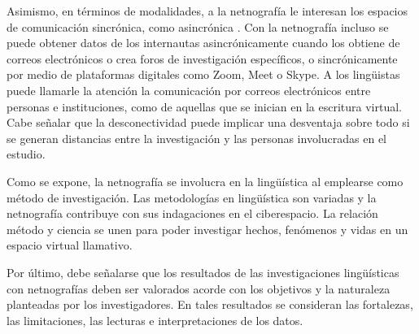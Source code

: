 Asimismo, en términos de modalidades, a la netnografía le interesan los
espacios de comunicación sincrónica, como asincrónica \cite{kozinets2010}.
Con la netnografía incluso se puede obtener datos de los internautas
asincrónicamente cuando los obtiene de correos electrónicos o crea foros
de investigación específicos, o sincrónicamente por medio de plataformas
digitales como Zoom, Meet o Skype. A los lingüistas puede llamarle la
atención la comunicación por correos electrónicos entre personas e
instituciones, como de aquellas que se inician en la escritura virtual.
Cabe señalar que la desconectividad puede implicar una desventaja sobre
todo si se generan distancias entre la investigación y las personas
involucradas en el estudio.

Como se expone, la netnografía se involucra en la lingüística al
emplearse como método de investigación. Las metodologías en lingüística
son variadas y la netnografía contribuye con sus indagaciones en el
ciberespacio. La relación método y ciencia se unen para poder investigar
hechos, fenómenos y vidas en un espacio virtual llamativo.

Por último, debe señalarse que los resultados de las investigaciones
lingüísticas con netnografías deben ser valorados acorde con los
objetivos y la naturaleza planteadas por los investigadores. En tales
resultados se consideran las fortalezas, las limitaciones, las lecturas
e interpretaciones de los datos.
